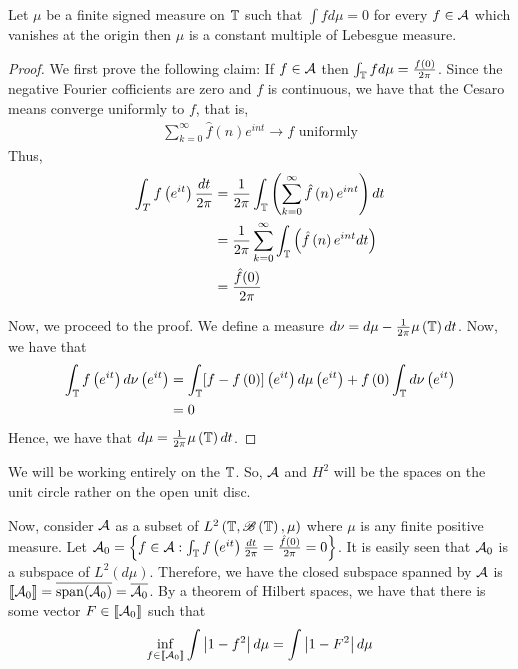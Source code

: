 \begin{corollary}
    Let $\mu$ be a finite signed  measure on $\mathbb T$ such that $\int f d\mu = 0$ for every $f\in {\cal A}$ which vanishes at the origin then $\mu$ is a constant multiple of Lebesgue measure.
    \label{cor:constant-multiple-of-Lebesgue}
\end{corollary}
\begin{proof}
    We first prove the following claim: If $f \in {\cal A}$ then $\int_{\mathbb T} f d\mu = \frac{f\left( 0 \right)}{2\pi}$. Since the negative Fourier cofficients are zero and $f$ is continuous, we have that the Cesaro means converge uniformly to $f$, that is,
    \begin{align*}
	\sum_{k=0}^{\infty} \hat{f} \left( n \right) e^{int} \rightarrow f \text{ uniformly}
    \end{align*}
    Thus,
\begin{align*}
    \int_{T} f\left( e^{it} \right) \frac{dt}{2\pi} &= \frac{1}{2\pi} \int_{\mathbb T}  \left(  \sum_{k=0}^{\infty}\hat{f} \left( n \right) e^{int} \right) dt\\
    &= \frac{1}{2\pi} \sum_{k=0}^{\infty} \int_{\mathbb T} \left( \hat{f} \left( n \right) e^{int} dt \right) \\
    &= \frac{\hat{f}(0)}{2\pi} 
    \end{align*}

    Now, we proceed to the proof. We define a measure $d\nu = d\mu - \frac{1}{2\pi} \mu \left( \mathbb T \right) dt$. Now, we have that
    \begin{align*}
	\int_{\mathbb T} f\left( e^{it} \right) d\nu \left( e^{it} \right) &= \int_{\mathbb T}[f-f\left( 0 \right)] \left( e^{it} \right) d\mu \left( e^{it} \right) + f\left( 0 \right) \int_{\mathbb T} d\nu \left( e^{it} \right) \\
	&= 0
    \end{align*}
    Hence, we have that $d\mu = \frac{1}{2\pi} \mu \left( \mathbb T \right) dt$.
\end{proof}

We will be working entirely on the $\mathbb T$. So, ${\cal A}$ and $H^{2}$ will be the spaces on the unit circle rather on the open unit disc. 

Now, consider ${\cal A}$ as a subset of $L^{2} \left( \mathbb T , {\mathscr B} \left( \mathbb T \right) , \mu \right)$ where $\mu$ is any finite positive measure. Let ${\cal A} _{0} = \left\{ f \in {\cal A} : \int_{\mathbb T} f\left( e^{it} \right) \frac{dt}{2\pi} = \frac{\hat{f} (0)}{2\pi}=0 \right\}$. It is easily seen that ${\cal A} _{0}$ is a subspace of $L^{2} \left( d\mu \right)$. Therefore, we have the closed subspace spanned by ${\cal A}$ is $\llbracket {\cal A}_{0} \rrbracket = \overline{ \operatorname{span} ({\cal A}_{0}) } = \overline{{\cal A}_{0}}$. By a theorem of Hilbert spaces, we have that there is some vector $F \in \llbracket {\cal A} _{0} \rrbracket$ such that
\begin{equation*}
    \inf_{f\in \llbracket {\cal A} _{0} \rrbracket} \int \left\lvert 1-f^{2} \right\rvert d\mu = \int \left\lvert 1-F^{2} \right\rvert d\mu
\end{equation*}

